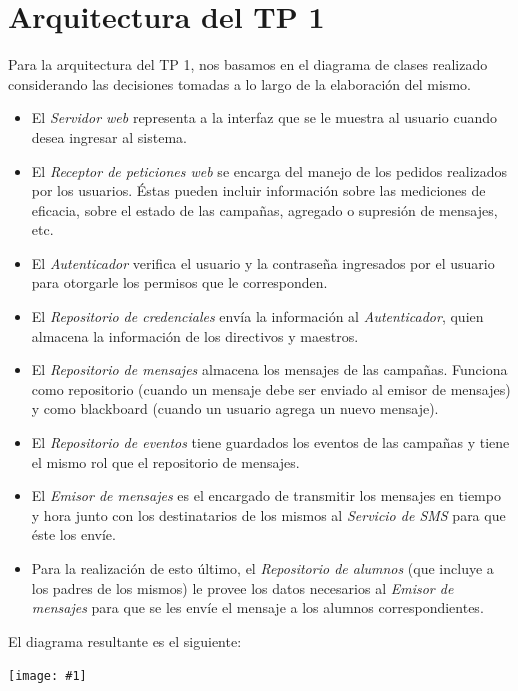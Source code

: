 \documentclass[a4paper, 10pt, twoside]{article}
\newcommand{\diagrama}[1]{
  \begin{center}
    \texttt{[image: \#1]}
  \end{center}
}
\begin{document}
\section{Arquitectura del TP 1}

Para la arquitectura del TP 1, nos basamos en el diagrama de clases realizado considerando las decisiones tomadas a lo largo de la elaboración del mismo.

\begin{itemize}
\item El \textit{Servidor web} representa a la interfaz que se le muestra al usuario cuando desea ingresar al sistema.
\item El \textit{Receptor de peticiones web} se encarga del manejo de los pedidos realizados por los usuarios. Éstas pueden incluir información sobre las mediciones de eficacia, sobre el estado de las campañas, agregado o supresión de mensajes, etc.
\item El \textit{Autenticador} verifica el usuario y la contraseña ingresados por el usuario para otorgarle los permisos que le corresponden.
\item El \textit{Repositorio de credenciales} envía la información al \textit{Autenticador}, quien almacena la información de los directivos y maestros.
\item El \textit{Repositorio de mensajes} almacena los mensajes de las campañas. Funciona como repositorio (cuando un mensaje debe ser enviado al emisor de mensajes) y como blackboard (cuando un usuario agrega un nuevo mensaje).
\item El \textit{Repositorio de eventos} tiene guardados los eventos de las campañas y tiene el mismo rol que el repositorio de mensajes.
\item El \textit{Emisor de mensajes} es el encargado de transmitir los mensajes en tiempo y hora junto con los destinatarios de los mismos al \textit{Servicio de SMS} para que éste los envíe.
\item Para la realización de esto último, el \textit{Repositorio de alumnos} (que incluye a los padres de los mismos) le provee los datos necesarios al \textit{Emisor de mensajes} para que se les envíe el mensaje a los alumnos correspondientes.
\end{itemize}

El diagrama resultante es el siguiente:

\diagrama{./diagramas/arquitecturaTP1.png}

\newpage


\end{document}
